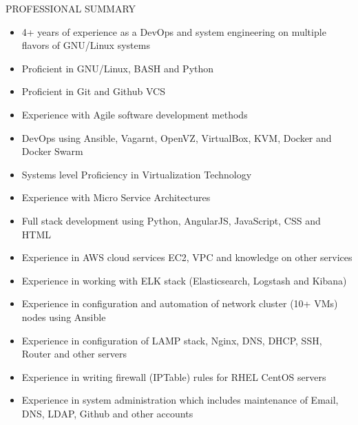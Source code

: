 \documentclass{resume} %
\begin{document}
\begin{rSection}{PROFESSIONAL SUMMARY}
  
  \begin{itemize}
    
  \item 4+ years of experience as a DevOps and system engineering on
    multiple flavors of GNU/Linux systems

  \item Proficient in GNU/Linux, BASH and Python

  \item Proficient in Git and Github VCS

  \item Experience with Agile software development methods

  \item DevOps using Ansible, Vagarnt, OpenVZ, VirtualBox,
    KVM, Docker and Docker Swarm

  \item Systems level Proficiency in Virtualization
        Technology
  
  \item Experience with Micro Service Architectures

  \item Full stack development using Python, AngularJS,
    JavaScript, CSS and HTML

  \item Experience in AWS cloud services EC2, VPC and knowledge on
    other services

  \item Experience in working with ELK stack (Elasticsearch,
    Logstash and Kibana)
    

  \item Experience in configuration and automation of
    network cluster (10+ VMs) nodes using Ansible
    
  \item Experience in configuration of LAMP stack,
    Nginx, DNS, DHCP, SSH, Router and other servers

  \item Experience in writing firewall (IPTable) rules for
    RHEL CentOS servers

  \item Experience in system administration which includes maintenance
    of Email, DNS, LDAP, Github and other accounts


\end{itemize}
\end{rSection}
\end{document}
